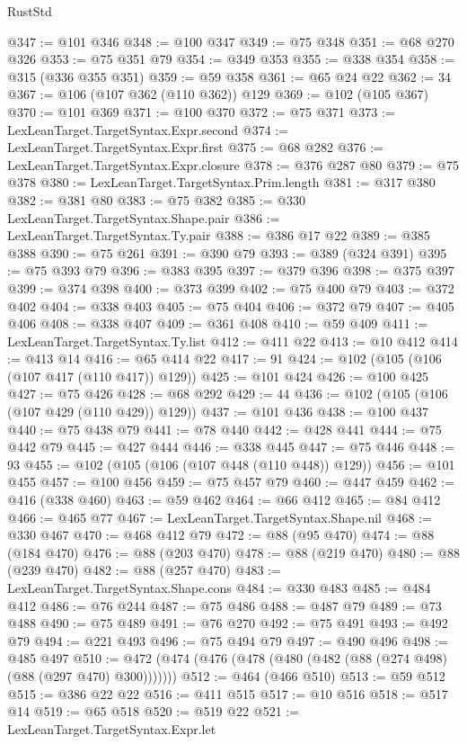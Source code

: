 \begin{lexlean}{RustStd}
\begin{coremodule}
@347 := @101 @346
@348 := @100 @347
@349 := @75 @348
@351 := @68 @270 @326
@353 := @75 @351 @79
@354 := @349 @353
@355 := @338 @354
@358 := @315 (@336 @355 @351)
@359 := @59 @358
@361 := @65 @24 @22
@362 := 34
@367 := @106 (@107 @362 (@110 @362)) @129
@369 := @102 (@105 @367)
@370 := @101 @369
@371 := @100 @370
@372 := @75 @371
@373 := LexLeanTarget.TargetSyntax.Expr.second
@374 := LexLeanTarget.TargetSyntax.Expr.first
@375 := @68 @282
@376 := LexLeanTarget.TargetSyntax.Expr.closure
@378 := @376 @287 @80
@379 := @75 @378
@380 := LexLeanTarget.TargetSyntax.Prim.length
@381 := @317 @380
@382 := @381 @80
@383 := @75 @382
@385 := @330 LexLeanTarget.TargetSyntax.Shape.pair
@386 := LexLeanTarget.TargetSyntax.Ty.pair
@388 := @386 @17 @22
@389 := @385 @388
@390 := @75 @261
@391 := @390 @79
@393 := @389 (@324 @391)
@395 := @75 @393 @79
@396 := @383 @395
@397 := @379 @396
@398 := @375 @397
@399 := @374 @398
@400 := @373 @399
@402 := @75 @400 @79
@403 := @372 @402
@404 := @338 @403
@405 := @75 @404
@406 := @372 @79
@407 := @405 @406
@408 := @338 @407
@409 := @361 @408
@410 := @59 @409
@411 := LexLeanTarget.TargetSyntax.Ty.list
@412 := @411 @22
@413 := @10 @412
@414 := @413 @14
@416 := @65 @414 @22
@417 := 91
@424 := @102 (@105 (@106 (@107 @417 (@110 @417)) @129))
@425 := @101 @424
@426 := @100 @425
@427 := @75 @426
@428 := @68 @292
@429 := 44
@436 := @102 (@105 (@106 (@107 @429 (@110 @429)) @129))
@437 := @101 @436
@438 := @100 @437
@440 := @75 @438 @79
@441 := @78 @440
@442 := @428 @441
@444 := @75 @442 @79
@445 := @427 @444
@446 := @338 @445
@447 := @75 @446
@448 := 93
@455 := @102 (@105 (@106 (@107 @448 (@110 @448)) @129))
@456 := @101 @455
@457 := @100 @456
@459 := @75 @457 @79
@460 := @447 @459
@462 := @416 (@338 @460)
@463 := @59 @462
@464 := @66 @412
@465 := @84 @412
@466 := @465 @77
@467 := LexLeanTarget.TargetSyntax.Shape.nil
@468 := @330 @467
@470 := @468 @412 @79
@472 := @88 (@95 @470)
@474 := @88 (@184 @470)
@476 := @88 (@203 @470)
@478 := @88 (@219 @470)
@480 := @88 (@239 @470)
@482 := @88 (@257 @470)
@483 := LexLeanTarget.TargetSyntax.Shape.cons
@484 := @330 @483
@485 := @484 @412
@486 := @76 @244
@487 := @75 @486
@488 := @487 @79
@489 := @73 @488
@490 := @75 @489
@491 := @76 @270
@492 := @75 @491
@493 := @492 @79
@494 := @221 @493
@496 := @75 @494 @79
@497 := @490 @496
@498 := @485 @497
@510 := @472 (@474 (@476 (@478 (@480 (@482 (@88 (@274 @498) (@88 (@297 @470) @300)))))))
@512 := @464 (@466 @510)
@513 := @59 @512
@515 := @386 @22 @22
@516 := @411 @515
@517 := @10 @516
@518 := @517 @14
@519 := @65 @518
@520 := @519 @22
@521 := LexLeanTarget.TargetSyntax.Expr.let

\end{coremodule}
\end{lexlean}
